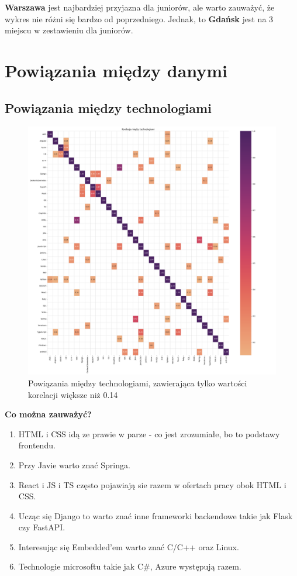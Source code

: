 \documentclass[a4paper]{article}
\begin{document}
\quad \textbf{Warszawa} jest najbardziej przyjazna dla juniorów, ale
warto zauważyć, że wykres nie różni się bardzo od poprzedniego. Jednak, to \textbf{Gdańsk} jest na 3 miejscu w zestawieniu dla juniorów.

\section{Powiązania między danymi}

\subsection{Powiązania między technologiami}

\begin{figure}[H]
    \centering
    \includegraphics[width=\textwidth]{../analysis/plots/korelacje/korelacja_między_technologiami.png}
    \caption{Powiązania między technologiami, zawierająca tylko wartości korelacji większe niż 0.14}
\end{figure}

\quad \textbf{Co można zauważyć?}

\begin{enumerate}
    \item HTML i CSS idą ze prawie w parze - co jest zrozumiałe, bo to podstawy frontendu.
    \item Przy Javie warto znać Springa.
    \item React i JS i TS często pojawiają sie razem w ofertach pracy obok HTML i CSS.
    \item Ucząc się Django to warto znać inne frameworki backendowe takie jak Flask czy FastAPI.
    \item Interesując się Embedded'em warto znać C/C++ oraz Linux.
    \item Technologie microsoftu takie jak C\#, Azure występują razem.
\end{enumerate}
\end{document}

